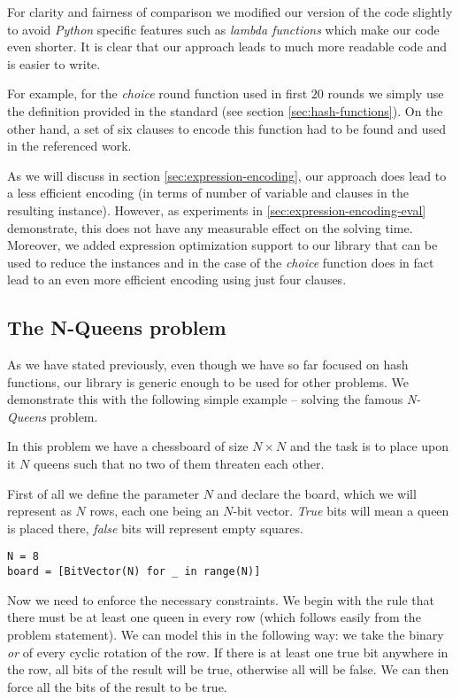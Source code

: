 For clarity and fairness of comparison we modified our version of the code slightly to avoid \emph{Python} specific features such as \emph{lambda functions} which make our code even shorter.
It is clear that our approach leads to much more readable code and is easier to write.

For example, for the \emph{choice} round function used in first $20$ rounds we simply use the definition provided in the standard (see section \ref{sec:hash-functions}).
On the other hand, a set of six clauses to encode this function had to be found and used in the referenced work.

As we will discuss in section \ref{sec:expression-encoding}, our approach does lead to a less efficient encoding (in terms of number of variable and clauses in the resulting instance).
However, as experiments in \ref{sec:expression-encoding-eval} demonstrate, this does not have any measurable effect on the solving time.
Moreover, we added expression optimization support to our library that can be used to reduce the instances and in the case of the \emph{choice} function does in fact lead to an even more efficient encoding using just four clauses.

\subsection{The N-Queens problem}
As we have stated previously, even though we have so far focused on hash functions, our library is generic enough to be used for other problems.
We demonstrate this with the following simple example -- solving the famous \emph{N-Queens} problem.

In this problem we have a chessboard of size $N\times N$ and the task is to place upon it $N$ queens such that no two of them threaten each other.

First of all we define the parameter $N$ and declare the board, which we will represent as $N$ rows, each one being an $N$-bit vector.
\emph{True} bits will mean a queen is placed there, \emph{false} bits will represent empty squares.

\begin{verbatim}
N = 8
board = [BitVector(N) for _ in range(N)]
\end{verbatim}

Now we need to enforce the necessary constraints.
We begin with the rule that there must be at least one queen in every row (which follows easily from the problem statement).
We can model this in the following way: we take the binary \emph{or} of every cyclic rotation of the row.
If there is at least one true bit anywhere in the row, all bits of the result will be true, otherwise all will be false.
We can then force all the bits of the result to be true.

